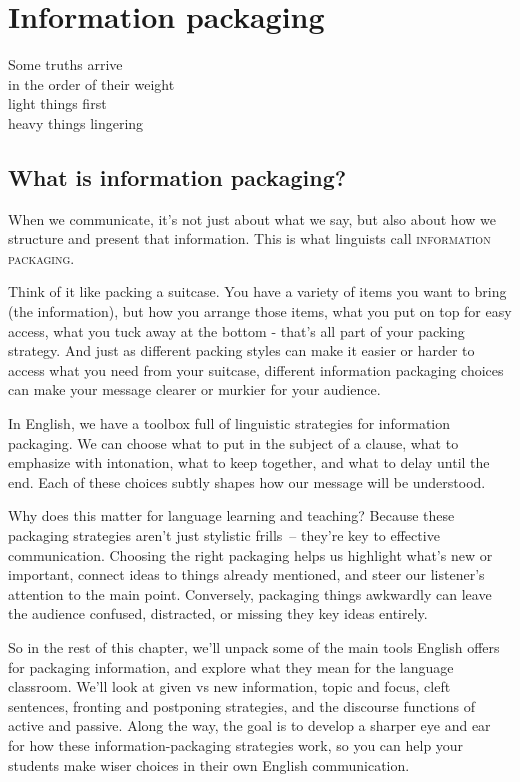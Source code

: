 \chapter{Information packaging} \label{ch:info-package}

\epigraph{Some truths arrive\\
in the order of their weight\\
light things first\\
heavy things lingering}{}

\section{What is information packaging?}

When we communicate, it's not just about what we say, but also about how we structure and present that information. This is what linguists call \textsc{information packaging}.

Think of it like packing a suitcase. You have a variety of items you want to bring (the information), but how you arrange those items, what you put on top for easy access, what you tuck away at the bottom - that's all part of your packing strategy. And just as different packing styles can make it easier or harder to access what you need from your suitcase, different information packaging choices can make your message clearer or murkier for your audience.

In English, we have a toolbox full of linguistic strategies for information packaging. We can choose what to put in the subject of a clause, what to emphasize with intonation, what to keep together, and what to delay until the end. Each of these choices subtly shapes how our message will be understood.

Why does this matter for language learning and teaching? Because these packaging strategies aren't just stylistic frills~-- they're key to effective communication. Choosing the right packaging helps us highlight what's new or important, connect ideas to things already mentioned, and steer our listener's attention to the main point. Conversely, packaging things awkwardly can leave the audience confused, distracted, or missing they key ideas entirely.

So in the rest of this chapter, we'll unpack some of the main tools English offers for packaging information, and explore what they mean for the language classroom. We'll look at given vs new information, topic and focus, cleft sentences, fronting and postponing strategies, and the discourse functions of active and passive. Along the way, the goal is to develop a sharper eye and ear for how these information-packaging strategies work, so you can help your students make wiser choices in their own English communication.

